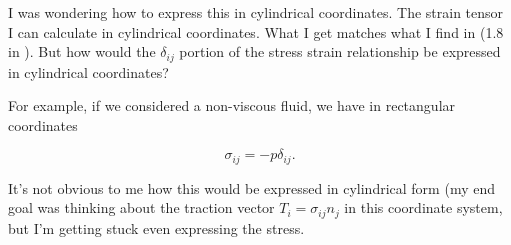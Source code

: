 I was wondering how to express this in cylindrical coordinates.  The strain tensor I can calculate in cylindrical coordinates.  What I get matches what I find in (1.8 in \cite{landau1960theory}).  But how would the $\delta_{ij}$ portion of the stress strain relationship be expressed in cylindrical coordinates?

For example, if we considered a non-viscous fluid, we have in rectangular coordinates

\begin{equation}\label{eqn:pipeFlowConstPressureGradient:90}
\sigma_{ij} = -p \delta_{ij}.
\end{equation}

It's not obvious to me how this would be expressed in cylindrical form (my end goal was thinking about the traction vector $T_i = \sigma_{ij} n_j$ in this coordinate system, but I'm getting stuck even expressing the stress.


\EndArticle
